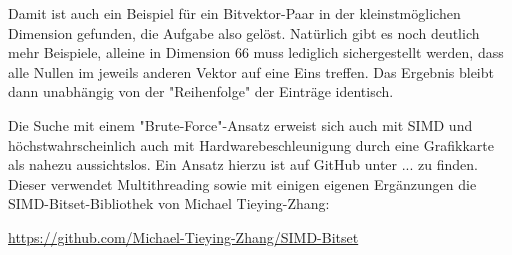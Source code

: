 \documentclass{article}
\begin{document}
Damit ist auch ein Beispiel für ein Bitvektor-Paar in der kleinstmöglichen Dimension gefunden, die Aufgabe also gelöst.
Natürlich gibt es noch deutlich mehr Beispiele, alleine in Dimension 66 muss lediglich sichergestellt werden, dass alle Nullen im jeweils anderen Vektor auf eine Eins treffen. Das Ergebnis bleibt dann unabhängig von der "Reihenfolge" der Einträge identisch.

Die Suche mit einem "Brute-Force"-Ansatz erweist sich auch mit SIMD und höchstwahrscheinlich auch mit Hardwarebeschleunigung durch eine Grafikkarte als nahezu aussichtslos. Ein Ansatz hierzu ist auf GitHub unter ... zu finden. Dieser verwendet Multithreading sowie mit einigen eigenen Ergänzungen die SIMD-Bitset-Bibliothek von Michael Tieying-Zhang:

\url{https://github.com/Michael-Tieying-Zhang/SIMD-Bitset}
\end{document}
